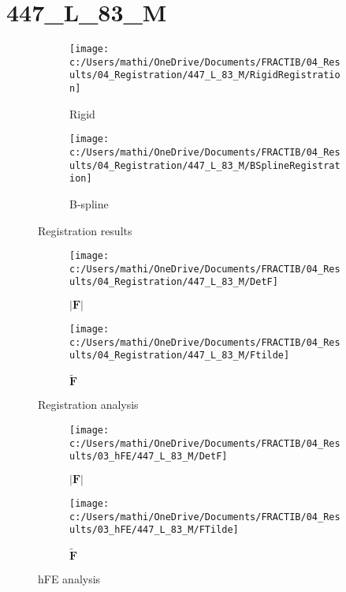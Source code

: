 \documentclass{article}%
\begin{document}
%
\newpage%
\section*{447\_L\_83\_M}%
\label{sec:447L83M}%


\begin{figure}[h!]%
\begin{subfigure}[b]{0.5\linewidth}%
\texttt{[image: c:/Users/mathi/OneDrive/Documents/FRACTIB/04\_Results/04\_Registration/447\_L\_83\_M/RigidRegistration]}%
\caption{Rigid}%
\end{subfigure}%
\begin{subfigure}[b]{0.5\linewidth}%
\texttt{[image: c:/Users/mathi/OneDrive/Documents/FRACTIB/04\_Results/04\_Registration/447\_L\_83\_M/BSplineRegistration]}%
\caption{B{-}spline}%
\end{subfigure}%
\caption{Registration results}%
\end{figure}

%


\begin{figure}[h!]%
\begin{subfigure}[b]{0.5\linewidth}%
\texttt{[image: c:/Users/mathi/OneDrive/Documents/FRACTIB/04\_Results/04\_Registration/447\_L\_83\_M/DetF]}%
\caption{$|\mathbf{F}|$}%
\end{subfigure}%
\begin{subfigure}[b]{0.5\linewidth}%
\texttt{[image: c:/Users/mathi/OneDrive/Documents/FRACTIB/04\_Results/04\_Registration/447\_L\_83\_M/Ftilde]}%
\caption{$\tilde{\mathbf{F}}$}%
\end{subfigure}%
\caption{Registration analysis}%
\end{figure}

%


\begin{figure}[h!]%
\begin{subfigure}[b]{0.5\linewidth}%
\texttt{[image: c:/Users/mathi/OneDrive/Documents/FRACTIB/04\_Results/03\_hFE/447\_L\_83\_M/DetF]}%
\caption{$|\mathbf{F}|$}%
\end{subfigure}%
\begin{subfigure}[b]{0.5\linewidth}%
\texttt{[image: c:/Users/mathi/OneDrive/Documents/FRACTIB/04\_Results/03\_hFE/447\_L\_83\_M/FTilde]}%
\caption{$\tilde{\mathbf{F}}$}%
\end{subfigure}%
\caption{hFE analysis}%
\end{figure}
\end{document}
